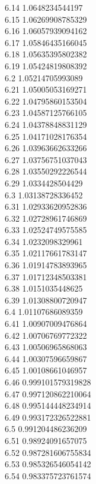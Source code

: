 {6.14	1.0648234544197\\
6.15	1.06269908785329\\
6.16	1.06057939094162\\
6.17	1.05846435166045\\
6.18	1.05635395802382\\
6.19	1.05424819808392\\
6.2	1.05214705993089\\
6.21	1.05005053169271\\
6.22	1.04795860153504\\
6.23	1.04587125766105\\
6.24	1.04378848831129\\
6.25	1.04171028176354\\
6.26	1.03963662633266\\
6.27	1.03756751037043\\
6.28	1.03550292226544\\
6.29	1.0334428504429\\
6.3	1.03138728336452\\
6.31	1.02933620952836\\
6.32	1.02728961746869\\
6.33	1.02524749575585\\
6.34	1.0232098329961\\
6.35	1.02117661783147\\
6.36	1.01914783893965\\
6.37	1.01712348503381\\
6.38	1.0151035448625\\
6.39	1.01308800720947\\
6.4	1.01107686089359\\
6.41	1.00907009476864\\
6.42	1.00706769772322\\
6.43	1.00506965868063\\
6.44	1.00307596659867\\
6.45	1.00108661046957\\
6.46	0.999101579319828\\
6.47	0.997120862210064\\
6.48	0.995144448234914\\
6.49	0.993172326522881\\
6.5	0.991204486236209\\
6.51	0.98924091657075\\
6.52	0.987281606755834\\
6.53	0.985326546054142\\
6.54	0.983375723761574\\
}

